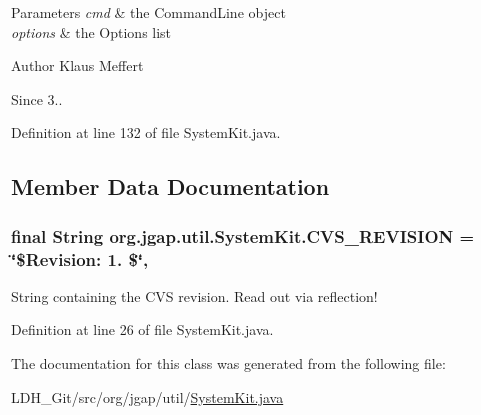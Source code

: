 \begin{DoxyParams}{Parameters}
{\em cmd} & the Command\-Line object \\
\hline
{\em options} & the Options list\\
\hline
\end{DoxyParams}
\begin{DoxyAuthor}{Author}
Klaus Meffert 
\end{DoxyAuthor}
\begin{DoxySince}{Since}
3.. 
\end{DoxySince}


Definition at line 132 of file System\-Kit.\-java.



\subsection{Member Data Documentation}
\hypertarget{classorg_1_1jgap_1_1util_1_1_system_kit_aff55c878d4cb6c0754185300a3340685}{
\subsubsection[{C\-V\-S\-\_\-\-R\-E\-V\-I\-S\-I\-O\-N}]{\setlength{\rightskip}{0pt plus 5cm}final String org.\-jgap.\-util.\-System\-Kit.\-C\-V\-S\-\_\-\-R\-E\-V\-I\-S\-I\-O\-N = \char`\"{}\$Revision\-: 1. \$\char`\"{}\hspace{0.3cm}{\ttfamily [static]}, {\ttfamily [private]}}}\label{classorg_1_1jgap_1_1util_1_1_system_kit_aff55c878d4cb6c0754185300a3340685}
String containing the C\-V\-S revision. Read out via reflection! 

Definition at line 26 of file System\-Kit.\-java.



The documentation for this class was generated from the following file\-:\begin{DoxyCompactItemize}
\item 
L\-D\-H\-\_\-\-Git/src/org/jgap/util/\hyperlink{_system_kit_8java}{System\-Kit.\-java}\end{DoxyCompactItemize}
